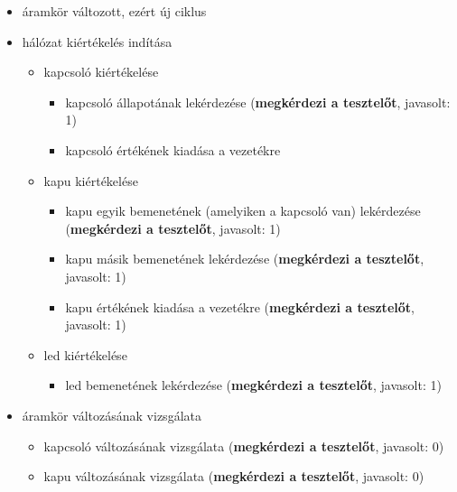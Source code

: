 {\begin{itemize}
\begin{itemize}
\begin{itemize}
	\item kapu változásának vizsgálata (\textit{idáig nem kéne eljutni, ha fent jót válaszolt a tesztelő})
	\item led változásának vizsgálata (\textit{idáig nem kéne eljutni, ha fent jót válaszolt a tesztelő})
\end{itemize}
\item áramkör változott, ezért új ciklus
\item hálózat kiértékelés indítása
\begin{itemize}
\setlength{\itemsep}{0cm}%
\setlength{\parskip}{0cm}%
\setlength{\itemindent}{-50pt}%
	\item kapcsoló kiértékelése
	\begin{itemize}
	\setlength{\itemsep}{0cm}%
	\setlength{\parskip}{0cm}%
	\setlength{\itemindent}{-65pt}%
		\item kapcsoló állapotának lekérdezése (\textbf{megkérdezi a tesztelőt}, javasolt: 1)
		\item kapcsoló értékének kiadása a vezetékre
	\end{itemize}
	\item kapu kiértékelése
	\begin{itemize}
	\setlength{\itemsep}{0cm}%
	\setlength{\parskip}{0cm}%
	\setlength{\itemindent}{-65pt}%
		\item kapu egyik bemenetének (amelyiken a kapcsoló van) lekérdezése (\textbf{megkérdezi a tesztelőt}, javasolt: 1)
		\item kapu másik bemenetének lekérdezése (\textbf{megkérdezi a tesztelőt}, javasolt: 1)
		\item kapu értékének kiadása a vezetékre (\textbf{megkérdezi a tesztelőt}, javasolt: 1)
	\end{itemize}
	\item led kiértékelése
	\begin{itemize}
	\setlength{\itemsep}{0cm}%
	\setlength{\parskip}{0cm}%
	\setlength{\itemindent}{-65pt}%
		\item led bemenetének lekérdezése (\textbf{megkérdezi a tesztelőt}, javasolt: 1)
	\end{itemize}
\end{itemize}
\item áramkör változásának vizsgálata
\begin{itemize}
\setlength{\itemsep}{0cm}%
\setlength{\parskip}{0cm}%
\setlength{\itemindent}{-50pt}%
	\item kapcsoló változásának vizsgálata (\textbf{megkérdezi a tesztelőt}, javasolt: 0)
	\item kapu változásának vizsgálata (\textbf{megkérdezi a tesztelőt}, javasolt: 0)

\end{itemize}
\end{itemize}
\end{itemize}}
